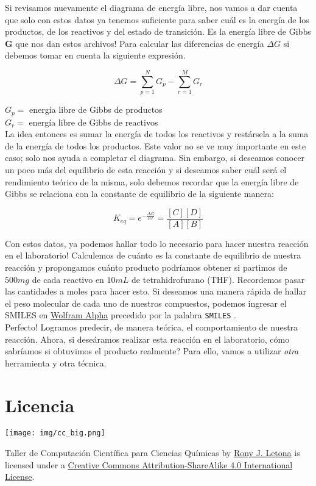 \documentclass[10pt,letterpaper]{article}
\newcommand{\inlinecode}[1]{
\colorbox{light-gray}{\texttt{#1}}
}
\begin{document}
Si revisamos nuevamente el diagrama de energ\'ia libre, nos vamos a dar cuenta que solo con estos datos ya tenemos suficiente para saber cu\'al es la energ\'ia de los productos, de los reactivos y del estado de transici\'on. Es la energ\'ia libre de Gibbs \textbf{G} que nos dan estos archivos! Para calcular las diferencias de energ\'ia $\Delta G$ si debemos tomar en cuenta la siguiente expresi\'on.

\begin{equation}
\Delta G = \sum^{N}_{p=1} G_{p} - \sum^{M}_{r=1} G_{r}
\end{equation}

\noindent $G_{p} =$ energ\'ia libre de Gibbs de productos\\
$G_{r} =$ energ\'ia libre de Gibbs de reactivos\\

La idea entonces es sumar la energ\'ia de todos los reactivos y rest\'arsela a la suma de la energ\'ia de todos los productos. Este valor no se ve muy importante en este caso; solo nos ayuda a completar el diagrama. Sin embargo, si deseamos conocer un poco m\'as del equilibrio de esta reacci\'on y si deseamos saber cu\'al ser\'a el rendimiento te\'orico de la misma, solo debemos recordar que la energ\'ia libre de Gibbs se relaciona con la constante de equilibrio de la siguiente manera:

\begin{equation}
K_{eq} = e^{- \frac{\Delta G}{R T} } = \frac{ \left[ C \right] \left[ D \right] }{ \left[ A \right] \left[ B \right] }
\end{equation}

Con estos datos, ya podemos hallar todo lo necesario para hacer nuestra reacci\'on en el laboratorio! Calculemos de cu\'anto es la constante de equilibrio de nuestra reacci\'on y propongamos cu\'anto producto podr\'iamos obtener si partimos de $500mg$ de cada reactivo en $10mL$ de tetrahidrofurano (THF). Recordemos pasar las cantidades a moles para hacer esto. Si deseamos una manera r\'apida de hallar el peso molecular de cada uno de nuestros compuestos, podemos ingresar el SMILES en \href{https://www.wolframalpha.com/}{Wolfram Alpha} precedido por la palabra \inlinecode{SMILES}.\\

Perfecto! Logramos predecir, de manera te\'orica, el comportamiento de nuestra reacci\'on. Ahora, si dese\'aramos realizar esta reacci\'on en el laboratorio, c\'omo sabr\'iamos si obtuvimos el producto realmente? Para ello, vamos a utilizar \textit{otra} herramienta y otra t\'ecnica.


\section*{Licencia}

\noindent \texttt{[image: img/cc\_big.png]}

\noindent Taller de Computaci\'on Cient\'ifica para Ciencias Qu\'imicas by \href{http://github.com/zronyj/TC3Q}{Rony J. Letona} is licensed under a \href{http://creativecommons.org/licenses/by-sa/4.0/}{Creative Commons Attribution-ShareAlike 4.0 International License}.
\end{document}
